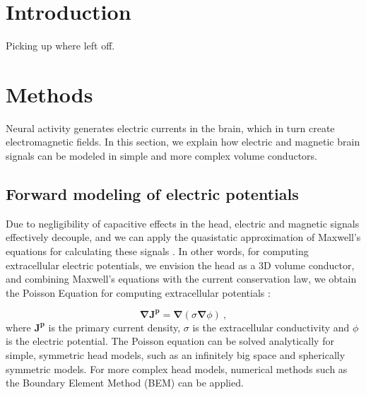 \documentclass[preprint,10pt,authoryear]{elsarticle}
\newcommand{\sntxt}[1]{{\color{NavyBlue}#1}}
\begin{document}
\linenumbers


\section{Introduction}\label{sec:introduction}
\sntxt{Picking up where \cite{LINDEN2010} left off.}
\section{Methods}\label{sec:methods}
Neural activity generates electric currents in the brain, which in turn create electromagnetic fields. In this section, we explain how electric and magnetic brain signals can be modeled in simple and more complex volume conductors.

\subsection{Forward modeling of electric potentials}
Due to negligibility of capacitive effects in the head, electric and magnetic signals effectively decouple, and we can apply the quasistatic approximation of Maxwell's equations for calculating these signals \citep{HAMALAINEN1993,NUNEZ2006}. In other words, for computing extracellular electric potentials, we envision the head as a 3D volume conductor, and combining Maxwell's equations with the current conservation law, we obtain the Poisson Equation for computing extracellular potentials \cite{GRIFFITHS1999}:


\begin{equation} \label{eq:poisson}
\mathbf{\nabla} \mathbf{J^p} = \mathbf{\nabla} (\sigma \mathbf{\nabla} \phi)~,
\end{equation}
where $\mathbf{J^p}$ is the primary current density, $\sigma$ is the extracellular conductivity and $\phi$ is the electric potential. The Poisson equation can be solved analytically for simple, symmetric head models, such as an infinitely big space and spherically symmetric models. For more complex head models, numerical methods such as the Boundary Element Method (BEM) can be applied.
\end{document}
